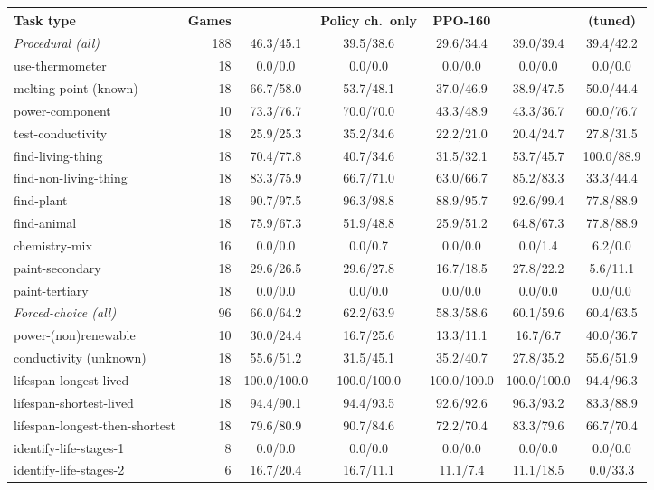 \begin{tabular}{l r c c c c c }
\toprule
Task type & Games & \wmppo{} & Policy ch.\ only & PPO-160 & \qppo{} & \sopo{} (tuned) \\
\midrule
\emph{Procedural (all)} & 188 & 46.3/45.1 & 39.5/38.6 & 29.6/34.4 & 39.0/39.4 & 39.4/42.2 \\
\quad use-thermometer & 18 & 0.0/0.0 & 0.0/0.0 & 0.0/0.0 & 0.0/0.0 & 0.0/0.0 \\
\quad melting-point (known) & 18 & 66.7/58.0 & 53.7/48.1 & 37.0/46.9 & 38.9/47.5 & 50.0/44.4 \\
\quad power-component & 10 & 73.3/76.7 & 70.0/70.0 & 43.3/48.9 & 43.3/36.7 & 60.0/76.7 \\
\quad test-conductivity & 18 & 25.9/25.3 & 35.2/34.6 & 22.2/21.0 & 20.4/24.7 & 27.8/31.5 \\
\quad find-living-thing & 18 & 70.4/77.8 & 40.7/34.6 & 31.5/32.1 & 53.7/45.7 & 100.0/88.9 \\
\quad find-non-living-thing & 18 & 83.3/75.9 & 66.7/71.0 & 63.0/66.7 & 85.2/83.3 & 33.3/44.4 \\
\quad find-plant & 18 & 90.7/97.5 & 96.3/98.8 & 88.9/95.7 & 92.6/99.4 & 77.8/88.9 \\
\quad find-animal & 18 & 75.9/67.3 & 51.9/48.8 & 25.9/51.2 & 64.8/67.3 & 77.8/88.9 \\
\quad chemistry-mix & 16 & 0.0/0.0 & 0.0/0.7 & 0.0/0.0 & 0.0/1.4 & 6.2/0.0 \\
\quad paint-secondary & 18 & 29.6/26.5 & 29.6/27.8 & 16.7/18.5 & 27.8/22.2 & 5.6/11.1 \\
\quad paint-tertiary & 18 & 0.0/0.0 & 0.0/0.0 & 0.0/0.0 & 0.0/0.0 & 0.0/0.0 \\
\midrule
\emph{Forced-choice (all)} & 96 & 66.0/64.2 & 62.2/63.9 & 58.3/58.6 & 60.1/59.6 & 60.4/63.5 \\
\quad power-(non)renewable & 10 & 30.0/24.4 & 16.7/25.6 & 13.3/11.1 & 16.7/6.7 & 40.0/36.7 \\
\quad conductivity (unknown) & 18 & 55.6/51.2 & 31.5/45.1 & 35.2/40.7 & 27.8/35.2 & 55.6/51.9 \\
\quad lifespan-longest-lived & 18 & 100.0/100.0 & 100.0/100.0 & 100.0/100.0 & 100.0/100.0 & 94.4/96.3 \\
\quad lifespan-shortest-lived & 18 & 94.4/90.1 & 94.4/93.5 & 92.6/92.6 & 96.3/93.2 & 83.3/88.9 \\
\quad lifespan-longest-then-shortest & 18 & 79.6/80.9 & 90.7/84.6 & 72.2/70.4 & 83.3/79.6 & 66.7/70.4 \\
\quad identify-life-stages-1 & 8 & 0.0/0.0 & 0.0/0.0 & 0.0/0.0 & 0.0/0.0 & 0.0/0.0 \\
\quad identify-life-stages-2 & 6 & 16.7/20.4 & 16.7/11.1 & 11.1/7.4 & 11.1/18.5 & 0.0/33.3 \\
\bottomrule
\end{tabular}
